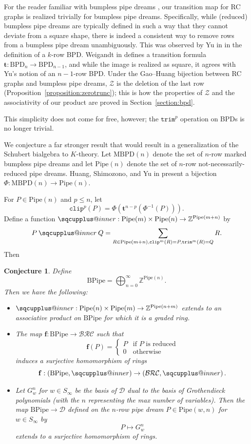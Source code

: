 \documentclass{amsart}
\makeatletter
\newcommand{\sqcupplus@inner}[2]{%
  \vcenter{\hbox{\ooalign{%
    \hfil$\m@th#1\sqcup$\hfil\cr
    \hfil\raisebox{0.15ex}{$\m@th#1\scriptscriptstyle+$}\hfil\cr
  }}}%
}
\newcommand{\sqcupplus}{\mathbin{\mathpalette\sqcupplus@inner\relax}}
\newtheorem{conjecture}[theorem]{Conjecture}
\theoremstyle{definition}
\theoremstyle{remark}
\numberwithin{equation}{subsection}
\newcommand{\trm}{\mathtt{trim}}
\newcommand{\zeromap}{\mathcal{Z}}
\newcommand{\clp}{\mathtt{clip}}
\newcommand{\BRC}{\mathcal{BRC}}
\newcommand{\dcoma}{\mathcal{D}}
\makeatother
\begin{document}
For the reader familiar with bumpless pipe dreams \cite{lam2021back}, our transition map for RC graphs is realized trivially for bumpless pipe dreams. Specifically, while (reduced) bumpless pipe dreams are typically defined in such a way that they cannot deviate from a square shape, there is indeed a consistent way to remove rows from a bumpless pipe dream unambiguously. This was observed by Yu in \cite[Lemma~3.18]{Yu2025EmbeddingBP} in the definition of a $k$-row BPD. Weigandt in \cite{Weigandt2021} defines a transition formula $\mathbf{t}:\mathrm{BPD}_n\to\mathrm{BPD}_{n-1}$, and while the image is realized as square, it agrees with Yu's notion of an $n-1$-row BPD. Under the Gao--Huang bijection \cite{GaoHuang2023} between RC graphs and bumpless pipe dreams, $\zeromap$ is the deletion of the last row (Proposition~\ref{proposition:zerotrunc}); this is how the properties of $\zeromap$ and the associativity of our product are proved in Section~\ref{section:bpd}.

This simplicity does not come for free, however; the $\trm^p$ operation on BPDs is no longer trivial.

We conjecture a far stronger result that would result in a generalization of the Schubert bialgebra to $K$-theory. Let $\mathrm{MBPD}(n)$ denote the set of $n$-row marked bumpless pipe dreams and let $\mathrm{Pipe}(n)$ denote the set of $n$-row not-necessarily-reduced pipe dreams. Huang, Shimozono, and Yu in \cite{HuangShimozonoYu2024} present a bijection $\Phi:\mathrm{MBPD}(n)\to\mathrm{Pipe}(n)$.

For $P\in\mathrm{Pipe}(n)$ and $p\leq n$, let 
$$\clp^p(P) = \Phi(\mathbf{t}^{n-p}(\Phi^{-1}(P))).$$
Define a function $\sqcupplus:\mathrm{Pipe}(m)\times\mathrm{Pipe}(n)\to\mathbb{Z}^{\mathrm{Pipe}(m+n)}$ by
$$P\sqcupplus Q = \sum_{R\in \mathrm{Pipe}(m+n), \clp^m(R) = P, \trm^m(R) = Q} R.$$
Then
\begin{conjecture}
Define
$$\mathrm{BPipe} = \bigoplus_{n=0}^\infty \mathbb{Z}^{\mathrm{Pipe}(n)}.$$
Then we have the following:
\begin{itemize}
\item $\sqcupplus:\mathrm{Pipe}(n)\times\mathrm{Pipe}(m)\to\mathbb{Z}^{\mathrm{Pipe}(n+m)}$ extends to an associative product on $\mathrm{BPipe}$ for which it is a graded ring.
\item The map $\mathbf{f}:\mathrm{BPipe}\to\BRC$ such that
$$\mathbf{f}(P)=\begin{cases}
  P & \text{if } P\text{ is reduced} \\
  0 & \text{otherwise}
\end{cases}$$
induces a surjective homomorphism of rings 
$$\mathbf{f}:\left(\mathrm{BPipe}, \sqcupplus\right) \to \left(\BRC, \sqcupplus\right).$$

\item Let $G_w^n$ for $w\in S_\infty$ be the basis of $\dcoma$ dual to the basis of Grothendieck polynomials (with the $n$ representing the max number of variables). Then the map $\mathrm{BPipe}\to \dcoma$ defined on the $n$-row pipe dream $P\in\mathrm{Pipe}(w,n)$ for $w\in S_\infty$ by
$$P\mapsto G_w^n$$
extends to a surjective homomorphism of rings.
\end{itemize}
\end{conjecture}
\end{document}
